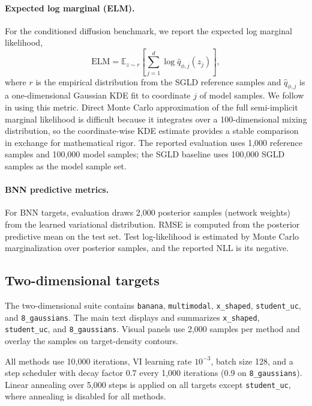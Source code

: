 \paragraph{Expected log marginal (ELM).}
For the conditioned diffusion benchmark, we report the expected log marginal likelihood,
\begin{equation}
  \mathrm{ELM}
  =
  \mathbb{E}_{z \sim r}
  \left[
    \sum_{j=1}^{d}
    \log \widehat{q}_{\phi,j}(z_j)
  \right],
\end{equation}
where $r$ is the empirical distribution from the SGLD reference samples and $\widehat{q}_{\phi,j}$ is a one-dimensional Gaussian KDE fit to coordinate $j$ of model samples.  We follow \citet{pielok2025revisiting} in using this metric.  Direct Monte Carlo approximation of the full semi-implicit marginal likelihood is difficult because it integrates over a 100-dimensional mixing distribution, so the coordinate-wise KDE estimate provides a stable comparison in exchange for mathematical rigor.  The reported evaluation uses 1,000 reference samples and 100,000 model samples; the SGLD baseline uses 100,000 SGLD samples as the model sample set.

\paragraph{BNN predictive metrics.}
For BNN targets, evaluation draws 2,000 posterior samples (network weights) from the learned variational distribution.  RMSE is computed from the posterior predictive mean on the test set.  Test log-likelihood is estimated by Monte Carlo marginalization over posterior samples, and the reported NLL is its negative.

\subsection{Two-dimensional targets}
\label{app:toy-details}

The two-dimensional suite contains \texttt{banana}, \texttt{multimodal}, \texttt{x\_shaped}, \texttt{student\_uc}, and \texttt{8\_gaussians}.  The main text displays and summarizes \texttt{x\_shaped}, \texttt{student\_uc}, and \texttt{8\_gaussians}.  Visual panels use 2,000 samples per method and overlay the samples on target-density contours.

All methods use 10,000 iterations, VI learning rate $10^{-3}$, batch size 128, and a step scheduler with decay factor 0.7 every 1,000 iterations (0.9 on \texttt{8\_gaussians}).  Linear annealing over 5,000 steps is applied on all targets except \texttt{student\_uc}, where annealing is disabled for all methods.

